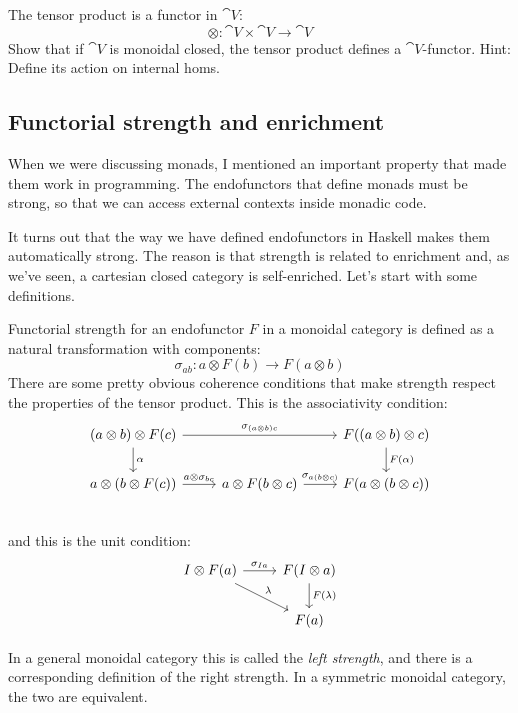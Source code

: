 \documentclass[DaoFP]{subfiles}
\begin{document}
\begin{exercise}
The tensor product is a functor in $\cat V$:
\[ \otimes \colon \cat V \times \cat V \to \cat V \]
Show that if $\cat V$ is monoidal closed, the tensor product defines a $\cat V$-functor. Hint: Define its action on internal homs.
\end{exercise}

\subsection{Functorial strength and enrichment}

When we were discussing monads, I mentioned an important property that made them work in programming. The endofunctors that define monads must be strong, so that we can access external contexts inside monadic code. 

It turns out that the way we have defined endofunctors in Haskell makes them automatically strong. The reason is that strength is related to enrichment and, as we've seen, a cartesian closed category is self-enriched. Let's start with some definitions.

Functorial strength for an endofunctor $F$ in a monoidal category is defined as a natural transformation with components:
\[ \sigma_{a b} \colon a \otimes F(b) \to F (a \otimes b) \]
There are some pretty obvious coherence conditions that make strength respect the properties of the tensor product. This is the associativity condition:
\[
 \begin{tikzcd}
 (a \otimes b) \otimes F (c) 
 \arrow[rr, "\sigma_{(a \otimes b) c}"]
 \arrow[d, "\alpha"]
 && F((a \otimes b) \otimes c)
 \arrow[d, "F(\alpha)"]
 \\
 a \otimes (b \otimes F(c))
 \arrow[r, "a \otimes \sigma_{b c}"]
 & a \otimes F(b \otimes c)
 \arrow[r, "\sigma_{a (b \otimes c)}"]
 & F(a \otimes (b \otimes c))
 \\
 \end{tikzcd}
\]
and this is the unit condition:
\[
 \begin{tikzcd}
 I \otimes F(a)
 \arrow[r, "\sigma_{I a}"]
 \arrow[rd, "\lambda"]
 & F(I \otimes a)
 \arrow[d, "F (\lambda)"]
 \\
 & F(a)
 \end{tikzcd}
\]

In a general monoidal category this is called the \emph{left strength}, and there is a corresponding definition of the right strength. In a symmetric monoidal category, the two are equivalent.
\end{document}
